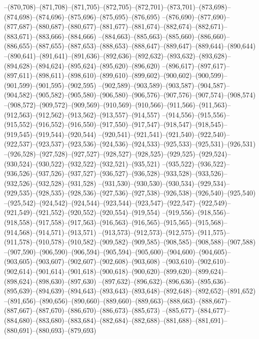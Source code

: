 --(870,708)--(871,708)--(871,705)--(872,705)--(872,701)--(873,701)--(873,698)--(874,698)--(874,696)--(875,696)--(875,695)--(876,695)
--(876,690)--(877,690)--(877,687)--(880,687)--(880,677)--(881,677)--(881,674)--(882,674)--(882,671)--(883,671)--(883,666)--(884,666)
--(884,663)--(885,663)--(885,660)--(886,660)--(886,655)--(887,655)--(887,653)--(888,653)--(888,647)--(889,647)--(889,644)--(890,644)
--(890,641)--(891,641)--(891,636)--(892,636)--(892,632)--(893,632)--(893,628)--(894,628)--(894,624)--(895,624)--(895,620)--(896,620)
--(896,617)--(897,617)--(897,611)--(898,611)--(898,610)--(899,610)--(899,602)--(900,602)--(900,599)--(901,599)--(901,595)--(902,595)
--(902,589)--(903,589)--(903,587)--(904,587)--(904,582)--(905,582)--(905,580)--(906,580)--(906,576)--(907,576)--(907,574)--(908,574)
--(908,572)--(909,572)--(909,569)--(910,569)--(910,566)--(911,566)--(911,563)--(912,563)--(912,562)--(913,562)--(913,557)--(914,557)
--(914,556)--(915,556)--(915,552)--(916,552)--(916,550)--(917,550)--(917,547)--(918,547)--(918,545)--(919,545)--(919,544)--(920,544)
--(920,541)--(921,541)--(921,540)--(922,540)--(922,537)--(923,537)--(923,536)--(924,536)--(924,533)--(925,533)--(925,531)--(926,531)
--(926,528)--(927,528)--(927,527)--(928,527)--(928,525)--(929,525)--(929,524)--(930,524)--(930,522)--(932,522)--(932,521)--(935,521)
--(935,522)--(936,522)--(936,526)--(937,526)--(937,527)--(936,527)--(936,528)--(933,528)--(933,526)--(932,526)--(932,528)--(931,528)
--(931,530)--(930,530)--(930,534)--(929,534)--(929,535)--(928,535)--(928,536)--(927,536)--(927,538)--(926,538)--(926,540)--(925,540)
--(925,542)--(924,542)--(924,544)--(923,544)--(923,547)--(922,547)--(922,549)--(921,549)--(921,552)--(920,552)--(920,554)--(919,554)
--(919,556)--(918,556)--(918,558)--(917,558)--(917,563)--(916,563)--(916,565)--(915,565)--(915,568)--(914,568)--(914,571)--(913,571)
--(913,573)--(912,573)--(912,575)--(911,575)--(911,578)--(910,578)--(910,582)--(909,582)--(909,585)--(908,585)--(908,588)--(907,588)
--(907,590)--(906,590)--(906,594)--(905,594)--(905,600)--(904,600)--(904,605)--(903,605)--(903,607)--(902,607)--(902,608)--(903,608)
--(903,610)--(902,610)--(902,614)--(901,614)--(901,618)--(900,618)--(900,620)--(899,620)--(899,624)--(898,624)--(898,630)--(897,630)
--(897,632)--(896,632)--(896,636)--(895,636)--(895,639)--(894,639)--(894,643)--(893,643)--(893,648)--(892,648)--(892,652)--(891,652)
--(891,656)--(890,656)--(890,660)--(889,660)--(889,663)--(888,663)--(888,667)--(887,667)--(887,670)--(886,670)--(886,673)--(885,673)
--(885,677)--(884,677)--(884,680)--(883,680)--(883,684)--(882,684)--(882,688)--(881,688)--(881,691)--(880,691)--(880,693)--(879,693)
